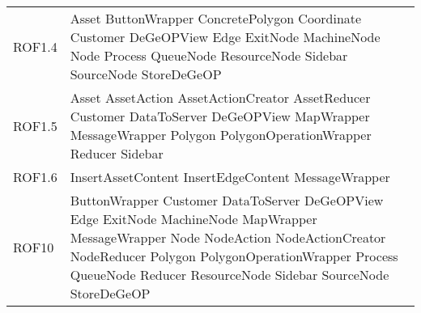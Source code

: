 \begin{longtable}{p{2.5cm}!{\VRule[1pt]}p{5cm}}
	ROF1.4 & Asset \newline ButtonWrapper \newline ConcretePolygon \newline Coordinate \newline Customer \newline DeGeOPView \newline Edge \newline ExitNode \newline MachineNode \newline Node \newline Process \newline QueueNode \newline ResourceNode \newline Sidebar \newline SourceNode \newline StoreDeGeOP\\
	ROF1.5 & Asset \newline AssetAction \newline AssetActionCreator \newline AssetReducer \newline Customer \newline DataToServer \newline DeGeOPView \newline MapWrapper \newline MessageWrapper \newline Polygon \newline PolygonOperationWrapper \newline Reducer \newline Sidebar\\
	ROF1.6 & InsertAssetContent \newline InsertEdgeContent \newline MessageWrapper\\
	ROF10 & ButtonWrapper \newline Customer \newline DataToServer \newline DeGeOPView \newline Edge \newline ExitNode \newline MachineNode \newline MapWrapper \newline MessageWrapper \newline Node \newline NodeAction \newline NodeActionCreator \newline NodeReducer \newline Polygon \newline PolygonOperationWrapper \newline Process \newline QueueNode \newline Reducer \newline ResourceNode \newline Sidebar \newline SourceNode \newline StoreDeGeOP\\

\end{longtable}
